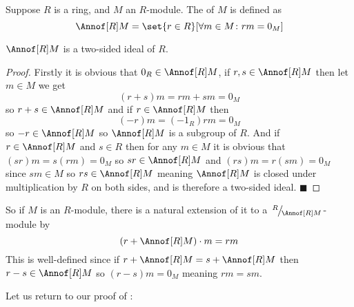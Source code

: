 \documentclass[10pt]{article}
\def\qed{\hskip1cm\hbox{}\hfill$\blacksquare$}
\begin{document}
\begin{defn*}

    Suppose $R$ is a ring, and $M$ an $R$-module.
    The  of $M$ is defined as
    \[ \Annof[R]M = \set{r\in R}[\forall m\in M\colon rm=0_M] \]

\end{defn*}

\begin{prop*}

    $\Annof[R]M$ is a two-sided ideal of $R$.

\end{prop*}

\begin{proof}

    Firstly it is obvious that $0_R\in\Annof[R]M$, if $r,s\in\Annof[R]M$ then let $m\in M$ we get
    \[ (r+s)m = rm + sm = 0_M \]
    so $r+s\in\Annof[R]M$ and if $r\in\Annof[R]M$ then
    \[ (-r)m = (-1_R)rm = 0_M \]
    so $-r\in\Annof[R]M$ so $\Annof[R]M$ is a subgroup of $R$.
    And if $r\in\Annof[R]M$ and $s\in R$ then for any $m\in M$ it is obvious that $(sr)m=s(rm)=0_M$ so $sr\in\Annof[R]M$ and $(rs)m=r(sm)=0_M$ since $sm\in M$ so $rs\in\Annof[R]M$ meaning $\Annof[R]M$ is
    closed under multiplication by $R$ on both sides, and is therefore a two-sided ideal.
    \qed

\end{proof}

So if $M$ is an $R$-module, there is a natural extension of it to a $\slfrac R{\Annof[R]M}$-module by
\[ (r+\Annof[R]M)\cdot m = rm \]
This is well-defined since if $r+\Annof[R]M=s+\Annof[R]M$ then $r-s\in\Annof[R]M$ so $(r-s)m=0_M$ meaning $rm=sm$.

Let us return to our proof of :
\end{document}
